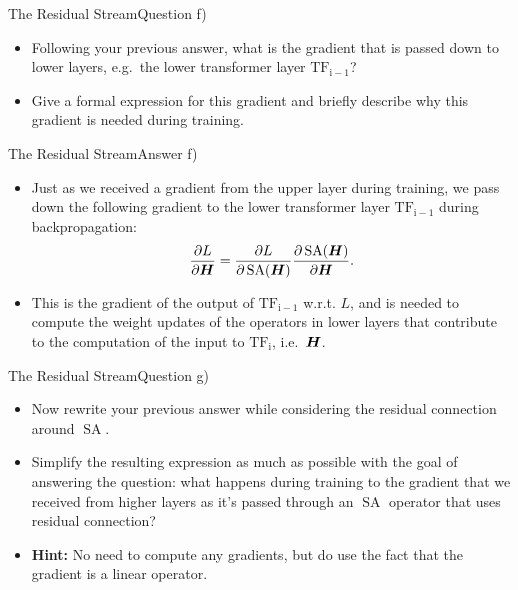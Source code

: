 \documentclass[t]{beamer}
\newcommand\op[1]{\operatorname{#1}}
\begin{document}
\begin{frame}{The Residual Stream}{Question f)}
    \begin{itemize}
        \item Following your previous answer, what is the gradient that is
              passed down to lower layers, e.g.\ the lower transformer layer
              $\op{TF_{i-1}}$?
        \item Give a formal expression for this gradient and briefly describe
              why this gradient is needed during training.
    \end{itemize}
\end{frame}

\begin{frame}{The Residual Stream}{Answer f)}
    \begin{itemize}
        \item Just as we received a gradient from the upper layer during
              training, we pass down the following gradient to the lower
              transformer layer $\op{TF_{i-1}}$ during backpropagation:
              \begin{align}\label{eq:input_gradient}
                  \frac{\partial L}{\partial \mH} = \frac{\partial L}{\partial \op{SA}(\mH)}\frac{\partial \op{SA}(\mH)}{\partial \mH}.
              \end{align}
        \item This is the gradient of the output of $\op{TF_{i-1}}$ w.r.t. $L$,
              and is needed to compute the weight updates of the operators in
              lower layers that contribute to the computation of the input to
              $\op{TF_i}$, i.e.\ ${\boldsymbol{H}}$.
    \end{itemize}
\end{frame}

\begin{frame}{The Residual Stream}{Question g)}
    \begin{itemize}
        \item Now rewrite your previous answer while considering the residual
              connection around $\op{SA}$.
        \item Simplify the resulting expression as much as possible with the
              goal of answering the question: what happens during training to
              the gradient that we received from higher layers as it's passed
              through an $\op{SA}$ operator that uses residual connection?
        \item \textbf{Hint:} No need to compute any gradients, but do use the
              fact that the gradient is a linear operator.
    \end{itemize}
\end{frame}
\end{document}
